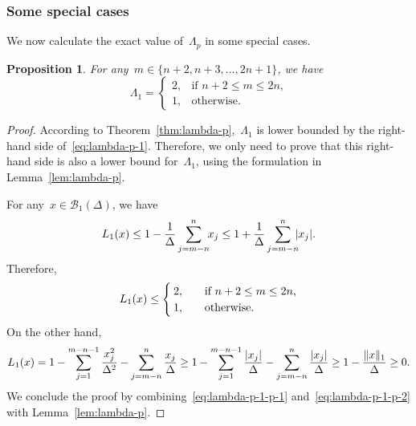 \documentclass[draft]{article}
\numberwithin{equation}{section}
\theoremstyle{definition}
\theoremstyle{plain}
\newtheorem{proposition}{Proposition}[section]
\newcommand*{\abs}[2][]{#1\lvert#2#1\rvert}
\newcommand*{\lagp}[1][]{L\ifblank{#1}{}{_{#1}}}
\newcommand*{\norm}[2][]{#1\lVert#2#1\rVert}
\newcommand*{\set}[2][]{#1\{#2#1\}}
\begin{document}
\subsubsection{Some special cases}

We now calculate the exact value of~$\Lambda_p$ in some special cases.

\begin{proposition}
    \label{prop:lambda-p-1}
    For any~$m \in \set{n + 2, n + 3, \dots, 2n + 1}$, we have
    \begin{equation}
        \label{eq:lambda-p-1}
        \Lambda_1 =
        \begin{cases}
            2,  & \text{if~$n + 2 \le m \le 2n$,}\\
            1,  & \text{otherwise.}
        \end{cases}
    \end{equation}
\end{proposition}

\begin{proof}
    According to Theorem~\ref{thm:lambda-p},~$\Lambda_1$ is lower bounded by the right-hand side of~\eqref{eq:lambda-p-1}.
    Therefore, we only need to prove that this right-hand side is also a lower bound for~$\Lambda_1$, using the formulation in Lemma~\ref{lem:lambda-p}.

    For any~$x \in \mathcal{B}_1(\Delta)$, we have
    \begin{equation*}
        \lagp[1](x) \le 1 - \frac{1}{\Delta} \sum_{j = m - n}^n \!\! x_j \le 1 + \frac{1}{\Delta} \sum_{j = m - n}^n \!\! \abs{x_j}.
    \end{equation*}
    Therefore,
    \begin{equation}
        \label{eq:lambda-p-1-p-1}
        \lagp[1](x) \le
        \begin{cases}
            2,  & \quad \text{if~$n + 2 \le m \le 2n$,}\\
            1,  & \quad \text{otherwise.}
        \end{cases}
    \end{equation}
    On the other hand,
    \begin{equation}
        \label{eq:lambda-p-1-p-2}
        \lagp[1](x) = 1 - \sum_{j = 1}^{m - n - 1} \frac{x_j^2}{\Delta^2} - \sum_{j = m - n}^n \frac{x_j}{\Delta} \ge 1 - \sum_{j = 1}^{m - n - 1} \frac{\abs{x_j}}{\Delta} - \sum_{j = m - n}^n \frac{\abs{x_j}}{\Delta} \ge 1 - \frac{\norm{x}_1}{\Delta} \ge 0.
    \end{equation}
    We conclude the proof by combining~\eqref{eq:lambda-p-1-p-1} and~\eqref{eq:lambda-p-1-p-2} with Lemma~\ref{lem:lambda-p}.
\end{proof}
\end{document}
